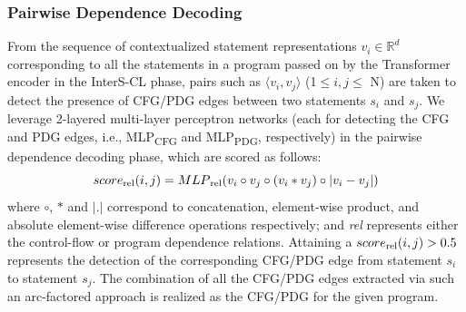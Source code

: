 
\vspace{1pt}
\subsubsection{\bf Pairwise Dependence Decoding}

From the sequence of contextualized statement representations $v_i \in
\mathbb{R}^d$ corresponding to all the statements in a program passed
on by the Transformer encoder in the InterS-CL phase, pairs such
as $\langle v_i, v_j \rangle$ (1$\leq i, j\leq$ N) are taken to detect
the presence of CFG/PDG edges between two statements $s_i$ and
$s_j$. We leverage 2-layered multi-layer perceptron networks (each
for detecting the CFG and PDG edges, i.e., MLP\textsubscript{CFG} and
MLP\textsubscript{PDG}, respectively) in the pairwise dependence
decoding phase, which are scored as follows:
\begin{equation}
\centering
    score\textsubscript{rel}(i, j) = MLP\textsubscript{rel}(v_i \circ v_j \circ (v_i * v_j) \circ |v_i - v_j|)
\end{equation}
where $\circ$, $*$ and $|.|$ correspond to concatenation, element-wise
product, and absolute element-wise difference operations respectively;
and \textit{rel} represents either the control-flow or program
dependence relations. Attaining a $score\textsubscript{rel}(i, j) >
0.5$ represents the detection of the corresponding CFG/PDG edge from
statement $s_i$ to statement $s_j$. The combination of all the CFG/PDG
edges extracted via such an arc-factored approach is realized as the
CFG/PDG for the given program.

